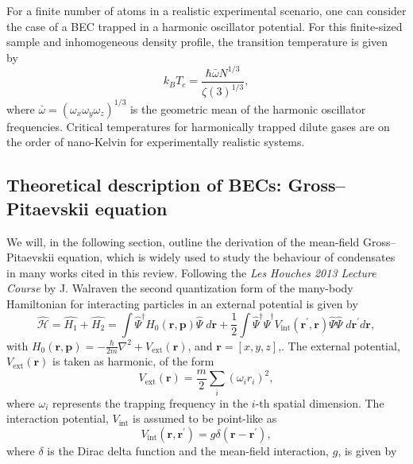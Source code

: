 For a finite number of atoms in a realistic experimental scenario, one can consider the case of a BEC trapped in a harmonic oscillator potential. For this finite-sized sample and inhomogeneous density profile, the transition temperature is given by~\cite{BK:Pitaevskii_Stringari_2003}
\begin{equation}
k_BT_c = \frac{\hbar\bar{\omega}N^{1/3}}{\zeta(3)^{1/3}},
\end{equation}
where $\bar{\omega}=(\omega_x\omega_y\omega_z)^{1/3}$ is the geometric mean of the harmonic oscillator frequencies. Critical temperatures for harmonically trapped dilute gases are on the order of nano-Kelvin for experimentally realistic systems.

\subsection{Theoretical description of BECs: Gross--Pitaevskii equation}\label{sub:gpederiv}
We will, in the following section, outline the derivation of the mean-field Gross--Pitaevskii equation, which is widely used to study the behaviour of condensates in many works cited in this review. Following the \textit{Les Houches 2013 Lecture Course} by J. Walraven \cite{LEC:Walraven_lh_2013} the second quantization form of the many-body Hamiltonian for interacting particles in an external potential is given by
\begin{equation}\label{eqn:ham2ndq}
\hat{\mathcal{H}} = \hat{H_1} + \hat{H_2} = \int \hat{\Psi}^{\dagger} H_0\left(\textbf{r},\textbf{p} \right)  \hat{\Psi} \; d\textbf{r}  + \frac{1}{2} \int\hat{\Psi}^{\dagger}\hat{\Psi}^{\dagger}V_{\textrm{int}}(\textbf{r}^\prime,\textbf{r})\hat{\Psi}\hat{\Psi} \; d\textbf{r}^\prime d\textbf{r},
\end{equation}
with $H_0\left(\mathbf{r}, \mathbf{p} \right) = -\frac{\hbar}{2m}\nabla^2 + V_{\textrm{ext}}\left(\mathbf{r}\right)$, and $\mathbf{r} = [x,y,z]$,. The external potential, $V_{\text{ext}}(\mathbf{r})$ is taken as harmonic, of the form
\begin{equation}
V_{\text{ext}}(\mathbf{r}) = \frac{m}{2}\displaystyle\sum_{i}{\left(\omega_i r_i \right)^2},\end{equation}
where $\omega_i$ represents the trapping frequency in the $i$-th spatial dimension. The interaction potential, $V_{\text{int}}$ is assumed to be point-like as
\begin{equation}\label{eqn:v_int}
	V_{\text{int}}\left(\mathbf{r},\mathbf{r}^{\prime} \right) = g\delta\left(\mathbf{r} - \mathbf{r}^{\prime}\right),
\end{equation} where $\delta$ is the Dirac delta function and the mean-field interaction, $g$, is given by
